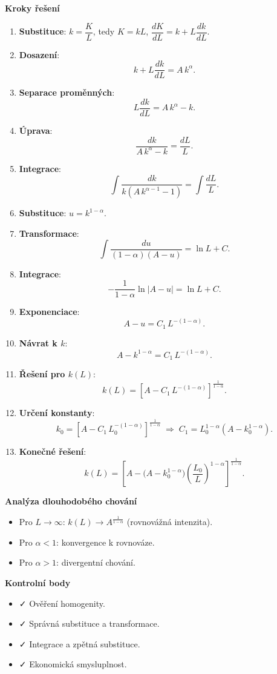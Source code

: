 \begin{example}
\noindent\textbf{Kroky řešení}
\begin{enumerate}
\item \textbf{Substituce}: $k = \dfrac{K}{L}$, tedy $K = kL$, $\dfrac{dK}{dL} = k + L\dfrac{dk}{dL}$.
\item \textbf{Dosazení}:
\[
k + L\frac{dk}{dL} = A\,k^\alpha.
\]
\item \textbf{Separace proměnných}:
\[
L\frac{dk}{dL} = A\,k^\alpha - k.
\]
\item \textbf{Úprava}:
\[
\frac{dk}{A\,k^\alpha - k} = \frac{dL}{L}.
\]
\item \textbf{Integrace}:
\[
\int \frac{dk}{k(A\,k^{\alpha-1} - 1)} = \int \frac{dL}{L}.
\]
\item \textbf{Substituce}: $u = k^{1-\alpha}$.
\item \textbf{Transformace}:
\[
\int \frac{du}{(1-\alpha)(A - u)} = \ln L + C.
\]
\item \textbf{Integrace}:
\[
-\frac{1}{1-\alpha}\ln|A - u| = \ln L + C.
\]
\item \textbf{Exponenciace}:
\[
A - u = C_1\,L^{-(1-\alpha)}.
\]
\item \textbf{Návrat k $k$}:
\[
A - k^{1-\alpha} = C_1\,L^{-(1-\alpha)}.
\]
\item \textbf{Řešení pro $k(L)$}:
\[
k(L) = \left[A - C_1\,L^{-(1-\alpha)}\right]^{\tfrac{1}{1-\alpha}}.
\]
\item \textbf{Určení konstanty}:
\[
k_0 = \left[A - C_1\,L_0^{-(1-\alpha)}\right]^{\tfrac{1}{1-\alpha}}
\;\Rightarrow\;
C_1 = L_0^{1-\alpha}\!\left(A - k_0^{1-\alpha}\right).
\]
\item \textbf{Konečné řešení}:
\[
k(L) = \left[A - \big(A - k_0^{1-\alpha}\big)\left(\frac{L_0}{L}\right)^{1-\alpha}\right]^{\tfrac{1}{1-\alpha}}.
\]
\end{enumerate}

\noindent\textbf{Analýza dlouhodobého chování}
\begin{itemize}
\item Pro $L \to \infty$: $k(L) \to A^{\tfrac{1}{1-\alpha}}$ (rovnovážná intenzita).
\item Pro $\alpha < 1$: konvergence k rovnováze.
\item Pro $\alpha > 1$: divergentní chování.
\end{itemize}

\noindent\textbf{Kontrolní body}
\begin{itemize}
\item ✓ Ověření homogenity.
\item ✓ Správná substituce a transformace.
\item ✓ Integrace a zpětná substituce.
\item ✓ Ekonomická smysluplnost.
\end{itemize}


\end{example}
